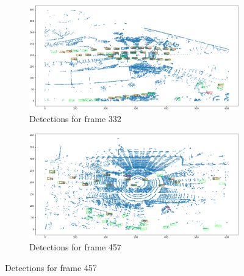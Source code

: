 \documentclass[letter]{article}
\begin{document}
	\begin{figure}[h]
		\begin{subfigure}[t]{0.49\textwidth}
			\centering
			\includegraphics[width=\linewidth]{images/det_332.png}
			\caption{Detections for frame 332}
		\end{subfigure}
		\begin{subfigure}[t]{0.49\textwidth}
			\centering
			\includegraphics[width=\linewidth]{images/det_457.png}
			\caption{Detections for frame 457}
		\end{subfigure}
		\vspace*{1mm}
	  

\end{figure}
\end{document}
